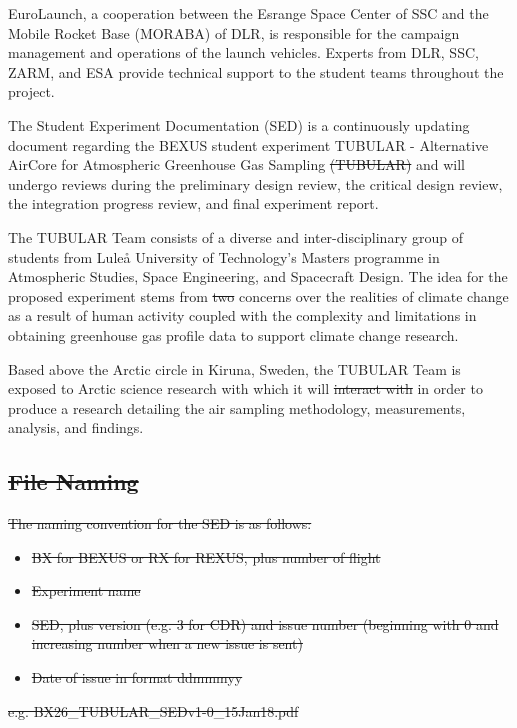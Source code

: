 \documentclass[a4paper,12pt,twoside, final]{article}
\providecommand{\DIFaddtex}[1]{{\protect\color{blue}\uwave{#1}}} %
\providecommand{\DIFdeltex}[1]{{\protect\color{red}\sout{#1}}}                      %
\providecommand{\DIFaddbegin}{} %
\providecommand{\DIFaddend}{} %
\providecommand{\DIFdelbegin}{} %
\providecommand{\DIFdelend}{} %
\providecommand{\DIFadd}[1]{\texorpdfstring{\DIFaddtex{#1}}{#1}} %
\providecommand{\DIFdel}[1]{\texorpdfstring{\DIFdeltex{#1}}{}} %
\newcommand{\DIFscaledelfig}{0.5}
\newlength{\DIFdelgraphicswidth} %
\newlength{\DIFdelgraphicsheight} %
\newcommand{\DIFaddincludegraphics}[2][]{{\color{blue}\fbox{\DIFOincludegraphics[#1]{#2}}}} %
\newcommand{\DIFdelincludegraphics}[2][]{%
\sbox{\DIFdelgraphicsbox}{\DIFOincludegraphics[#1]{#2}}%
\settoboxwidth{\DIFdelgraphicswidth}{\DIFdelgraphicsbox} %
\settoboxtotalheight{\DIFdelgraphicsheight}{\DIFdelgraphicsbox} %
\scalebox{\DIFscaledelfig}{%
\parbox[b]{\DIFdelgraphicswidth}{\usebox{\DIFdelgraphicsbox}\\[-\baselineskip] \rule{\DIFdelgraphicswidth}{0em}}\llap{\resizebox{\DIFdelgraphicswidth}{\DIFdelgraphicsheight}{%
\setlength{\unitlength}{\DIFdelgraphicswidth}%
\begin{picture}(1,1)%
\thicklines\linethickness{2pt} %
{\color[rgb]{1,0,0}\put(0,0){\framebox(1,1){}}}%
{\color[rgb]{1,0,0}\put(0,0){\line( 1,1){1}}}%
{\color[rgb]{1,0,0}\put(0,1){\line(1,-1){1}}}%
\end{picture}%
}\hspace*{3pt}}} %
} %
\DeclareRobustCommand{\DIFaddbegin}{\DIFOaddbegin \let\includegraphics\DIFaddincludegraphics} %
\DeclareRobustCommand{\DIFaddend}{\DIFOaddend \let\includegraphics\DIFOincludegraphics} %
\DeclareRobustCommand{\DIFdelbegin}{\DIFOdelbegin \let\includegraphics\DIFdelincludegraphics} %
\DeclareRobustCommand{\DIFdelend}{\DIFOaddend \let\includegraphics\DIFOincludegraphics} %
\begin{document}
EuroLaunch, a cooperation between the Esrange Space Center of SSC and the Mobile Rocket Base (MORABA) of DLR, is responsible for the campaign management and operations of the launch vehicles. Experts from DLR, SSC, ZARM, and ESA provide
technical support to the student teams throughout the project.

The Student Experiment Documentation (SED) is a continuously updating document regarding the BEXUS student experiment TUBULAR - Alternative \DIFaddbegin \DIFadd{to }\DIFaddend AirCore for Atmospheric Greenhouse Gas Sampling \DIFdelbegin \DIFdel{(TUBULAR) }\DIFdelend and will undergo reviews during the preliminary design review, the critical design review, the integration progress review, and final experiment report.

The TUBULAR Team consists of a diverse and inter-disciplinary group of students from Luleå University of Technology's Masters programme in Atmospheric Studies, Space Engineering, and Spacecraft Design. The idea for the proposed experiment stems from \DIFdelbegin \DIFdel{two }\DIFdelend concerns over the realities of climate change as a result of human activity coupled with the complexity and limitations in obtaining greenhouse gas profile data to support climate change research.

Based above the Arctic circle in Kiruna, Sweden, the TUBULAR Team is exposed to Arctic science research with which it will \DIFdelbegin \DIFdel{interact with }\DIFdelend \DIFaddbegin \DIFadd{collaborate }\DIFaddend in order to produce a research detailing the air sampling methodology, measurements, analysis, and findings.



\DIFdelbegin \subsection*{\DIFdel{File Naming}}
\DIFdel{The naming convention for the SED is as follows:
}%
\begin{itemize}%
\item%
\DIFdel{BX for BEXUS or RX for REXUS, plus number of flight
  }%
\item%
\DIFdel{Experiment name
  }%
\item%
\DIFdel{SED, plus version (e.g. 3 for CDR) and issue number (beginning with 0 and increasing number when a new issue is sent)
  }%
\item%
\DIFdel{Date of issue in format ddmmmyy
}
\end{itemize}%
\DIFdel{e.g. BX26\_TUBULAR\_SEDv1-0\_15Jan18.pdf
}%
\end{document}
